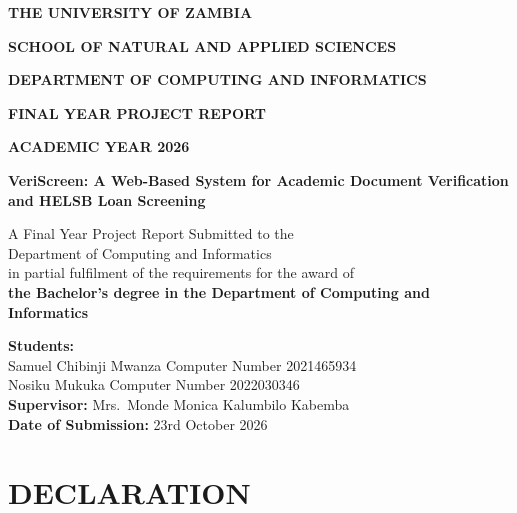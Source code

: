 \documentclass[12pt,a4paper]{report}
\begin{document}

\begin{titlepage}
\centering
\vspace*{1cm}

{\Large\bfseries THE UNIVERSITY OF ZAMBIA\par}
\vspace{0.4cm}
{\large\bfseries SCHOOL OF NATURAL AND APPLIED SCIENCES\par}
\vspace{0.4cm}
{\large\bfseries DEPARTMENT OF COMPUTING AND INFORMATICS\par}

\vfill

{\Large\bfseries FINAL YEAR PROJECT REPORT\par}
\vspace{0.5cm}
{\large\bfseries ACADEMIC YEAR 2026\par}

\vfill

{\LARGE\bfseries VeriScreen: A Web-Based System for Academic Document Verification and HELSB Loan Screening\par}

\vfill

A Final Year Project Report Submitted to the\\
Department of Computing and Informatics\\
in partial fulfilment of the requirements for the award of\\[0.2cm]
{\bfseries the Bachelor's degree in the Department of Computing and Informatics}

\vfill

{\bfseries Students:}\\[0.3cm]
Samuel Chibinji Mwanza \quad Computer Number 2021465934\\
Nosiku Mukuka \quad Computer Number 2022030346\\[0.5cm]
{\bfseries Supervisor:} Mrs.\ Monde Monica Kalumbilo Kabemba\\[0.3cm]
{\bfseries Date of Submission:} 23rd October 2026

\vfill
\end{titlepage}

\chapter*{DECLARATION}
\end{document}
